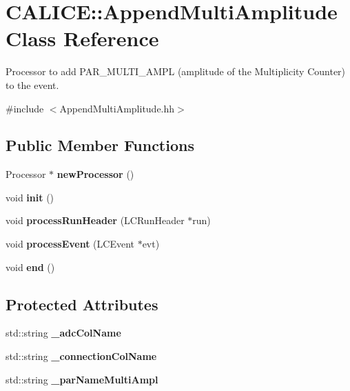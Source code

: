 \section{CALICE::AppendMultiAmplitude Class Reference}
\label{classCALICE_1_1AppendMultiAmplitude}


Processor to add PAR\_\-MULTI\_\-AMPL (amplitude of the Multiplicity Counter) to the event.  


{\ttfamily \#include $<$AppendMultiAmplitude.hh$>$}\subsection*{Public Member Functions}
\begin{DoxyCompactItemize}
\item 
Processor $\ast$ {\bfseries newProcessor} ()\label{classCALICE_1_1AppendMultiAmplitude_af5c8a3fce4bc7612157e3d6ad50872d6}

\item 
void {\bfseries init} ()\label{classCALICE_1_1AppendMultiAmplitude_a528565bad5c83a2677bc752f4d47d1f6}

\item 
void {\bfseries processRunHeader} (LCRunHeader $\ast$run)\label{classCALICE_1_1AppendMultiAmplitude_a6c147a934e7b60ecbf788f7de33bfde9}

\item 
void {\bfseries processEvent} (LCEvent $\ast$evt)\label{classCALICE_1_1AppendMultiAmplitude_a80b214680c8275820126d7826b2ca0e0}

\item 
void {\bfseries end} ()\label{classCALICE_1_1AppendMultiAmplitude_a9976e1ce7c039db675881af775f68986}

\end{DoxyCompactItemize}
\subsection*{Protected Attributes}
\begin{DoxyCompactItemize}
\item 
std::string {\bfseries \_\-adcColName}\label{classCALICE_1_1AppendMultiAmplitude_a90acd521e292e3f2bdd9ff56b4606f55}

\item 
std::string {\bfseries \_\-connectionColName}\label{classCALICE_1_1AppendMultiAmplitude_a2902a95068d152cb11826aafe85f63bb}

\item 
std::string {\bfseries \_\-parNameMultiAmpl}\label{classCALICE_1_1AppendMultiAmplitude_a209412842c94a4ff6be9af6f7b41bf89}

\end{DoxyCompactItemize}
